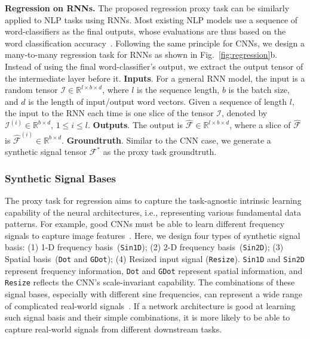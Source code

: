 \documentclass{article}
\begin{document}
\vspace{-2pt}
\textbf{Regression on RNNs.}
The proposed regression proxy task can be similarly applied to NLP tasks using RNNs.
Most existing NLP models use a sequence of word-classifiers as the final outputs, whose evaluations are thus based on the word classification accuracy~\cite{hochreiter1997long,mikolov2010recurrent,vaswani2017attention}.
Following the same principle for CNNs, we design a many-to-many regression task for RNNs as shown in Fig.~\ref{fig:regression}b.
Instead of using the final word-classifier's output, we extract the output tensor of the intermediate layer before it.
\textbf{Inputs}. For a general RNN model, the input is a random tensor $\mathcal{I}\in \mathbb{R}^{l\times b \times d}$, where $l$ is the sequence length, $b$ is the batch size, and $d$ is the length of input/output word vectors.
Given a sequence of length $l$, the input to the RNN each time is one slice of the tensor $\mathcal{I}$, denoted by $\mathcal{I}^{(i)} \in \mathbb{R}^{b \times d}$, $1 \leq i \leq l$. 
\textbf{Outputs}. The output is $\hat{\mathcal{F}}\in \mathbb{R}^{l\times b \times d}$, where a slice of $\hat{\mathcal{F}}$ is $\hat{\mathcal{F}}^{(i)} \in \mathbb{R}^{b\times d}$.
\textbf{Groundtruth}. Similar to the CNN case, we generate a synthetic signal tensor ${\mathcal{F}^*}$ as the proxy task groundtruth. 


\vspace{-6pt}
\subsubsection{Synthetic Signal Bases}
\label{sec:signals}
\vspace{-4pt}

The proxy task for regression aims to capture the task-agnostic intrinsic learning capability of the neural architectures, i.e., representing various fundamental data patterns.
For example, good CNNs must be able to learn different frequency signals to capture image features~\cite{xu2019frequency}.
Here, we design four types of synthetic signal basis: (1) 1-D frequency basis~(\texttt{Sin1D}); (2) 2-D frequency basis~(\texttt{Sin2D}); (3) Spatial basis~(\texttt{Dot} and \texttt{GDot}); (4) Resized input signal (\texttt{Resize}).
\texttt{Sin1D} and \texttt{Sin2D} represent frequency information, \texttt{Dot} and \texttt{GDot} represent spatial information, and \texttt{Resize} reflects the CNN's scale-invariant capability. The combinations of these signal bases, especially with different sine frequencies, can represent a wide range of complicated real-world signals~\cite{tolstov2012fourier}.
If a network architecture is good at learning such signal basis and their simple combinations, it is more likely to be able to capture real-world signals from different downstream tasks.
\end{document}
